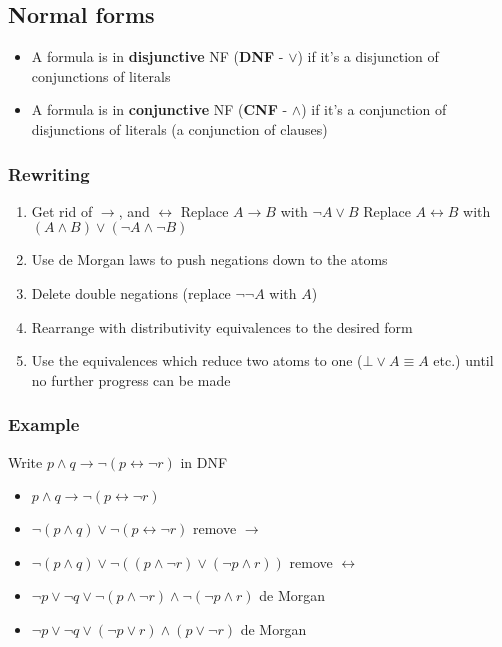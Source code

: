 \documentclass[a4paper, 12pt]{article}
\begin{document}
        \subsection*{Normal forms}
        \begin{itemize}
            \item A formula is in \textbf{disjunctive} NF (\textbf{DNF} - $\lor$) if it's a disjunction of conjunctions of literals
            \item A formula is in \textbf{conjunctive} NF (\textbf{CNF} - $\land$) if it's a conjunction of disjunctions of literals (a conjunction of clauses)
        \end{itemize}
        \subsubsection*{Rewriting}
        \begin{enumerate}[1.]
            \item Get rid of $\rightarrow$, and $\leftrightarrow$
                \subitem Replace $A \rightarrow B$ with $\neg A \lor B$
                \subitem Replace $A \leftrightarrow B$ with $(A \land B) \lor (\neg A \land \neg B)$
            \item Use de Morgan laws to push negations down to the atoms
            \item Delete double negations (replace $\neg \neg A$ with $A$)
            \item Rearrange with distributivity equivalences to the desired form
            \item Use the equivalences which reduce two atoms to one ($\bot \lor A \equiv A$ etc.) until no further progress can be made
        \end{enumerate}
        \subsubsection*{Example}
        Write $p \land q \rightarrow \neg (p \leftrightarrow \neg r)$ in DNF
        \begin{itemize}
            \item $p \land q \rightarrow \neg (p \leftrightarrow \neg r)$
            \item $\neg (p \land q) \lor \neg (p \leftrightarrow \neg r)$ \hfill remove $\rightarrow$
            \item $\neg (p \land q) \lor \neg ((p \land \neg r) \lor (\neg p \land r))$ \hfill remove $\leftrightarrow$
            \item $\neg p \lor \neg q \lor \neg (p \land \neg r) \land \neg (\neg p \land r)$ \hfill de Morgan
            \item $\neg p \lor \neg q \lor (\neg p \lor r) \land (p \lor \neg r) $ \hfill de Morgan
        \end{itemize}
    
\end{document}
